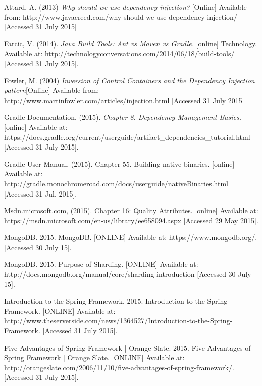 \begin{flushleft}

\begin{thebibliography}{99}
	 Attard, A. (2013) \textit{Why should we use dependency injection?} [Online] Available from: http://www.javacreed.com/why-should-we-use-dependency-injection/ [Accessed 31 July 2015]

	 Farcic, V. (2014). \textit{Java Build Tools: Ant vs Maven vs Gradle.} [online] Technology. Available at: http://technologyconversations.com/2014/06/18/build-tools/ [Accessed 31 July 2015].

	Fowler, M. (2004) \textit{Inversion of Control Containers and the Dependency Injection pattern}[Online] Available from: http://www.martinfowler.com/articles/injection.html [Accessed 31 July 2015]

	 Gradle Documentation, (2015). \textit{Chapter 8. Dependency Management Basics.} [online] Available at: https://docs.gradle.org/current/userguide/artifact\_dependencies\_tutorial.html [Accessed 31 July 2015].

	 Gradle User Manual, (2015). Chapter 55. Building native binaries. [online] Available at: http://gradle.monochromeroad.com/docs/userguide/nativeBinaries.html [Accessed 31 Jul. 2015].

	 Msdn.microsoft.com, (2015). Chapter 16: Quality Attributes. [online]  Available at: https://msdn.microsoft.com/en-us/library/ee658094.aspx [Accessed 29 May 2015].

	 MongoDB. 2015. MongoDB. [ONLINE] Available at: https://www.mongodb.org/. [Accessed 30 July 15].
	
	 MongoDB. 2015. Purpose of Sharding. [ONLINE] Available at: http://docs.mongodb.org/manual/core/sharding-introduction [Accessed 30 July 15].

	 Introduction to the Spring Framework. 2015. Introduction to the Spring Framework. [ONLINE] Available at: http://www.theserverside.com/news/1364527/Introduction-to-the-Spring-Framework. [Accessed 31 July 2015].
	
	 Five Advantages of Spring Framework | Orange Slate. 2015. Five Advantages of Spring Framework | Orange Slate. [ONLINE] Available at: http://orangeslate.com/2006/11/10/five-advantages-of-spring-framework/. [Accessed 31 July 2015].
	

\end{thebibliography}
\end{flushleft}
